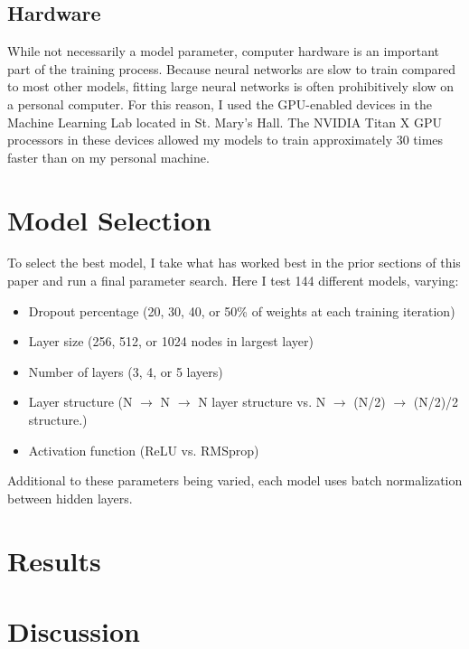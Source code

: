 \documentclass[12pt]{article}  %
\theoremstyle{definition}
\theoremstyle{remark}
\begin{document}
\subsection{Hardware}
\par While not necessarily a model parameter, computer hardware is an important part of the training process. Because neural networks are slow to train compared to most other models, fitting large neural networks is often prohibitively slow on a personal computer. For this reason, I used the GPU-enabled devices in the Machine Learning Lab located in St. Mary's Hall. The NVIDIA Titan X GPU processors in these devices allowed my models to train approximately 30 times faster than on my personal machine. 

\section{Model Selection}
\par To select the best model, I take what has worked best in the prior sections of this paper and run a final parameter search. Here I test 144 different models, varying:

\begin{itemize}
\item Dropout percentage (20, 30, 40, or 50\% of weights at each training iteration)
\item Layer size (256, 512, or 1024 nodes in largest layer)
\item Number of layers (3, 4, or 5 layers)
\item Layer structure (N $\rightarrow$ N $\rightarrow$ N layer structure vs. N $\rightarrow$ (N/2) $\rightarrow$ (N/2)/2 structure.)
\item Activation function (ReLU vs. RMSprop)
\end{itemize}

Additional to these parameters being varied, each model uses batch normalization between hidden layers.

\section{Results}

\section{Discussion}
\end{document}
